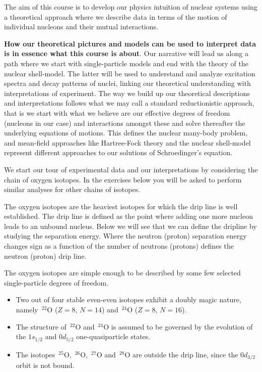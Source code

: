 \documentclass[graybox,sectrefs,envcountresetchap,open=right]{svmonodo}
\begin{document}
The aim of this course is to develop our physics intuition of nuclear systems using  a theoretical approach  where we describe data in terms of 
the motion of individual nucleons and their mutual interactions. 

\textbf{How our theoretical pictures and models can be used to interpret data is in essence what this course is about}. Our narrative will lead us along a path where we start with single-particle models and end with the theory of the nuclear shell-model. The latter will be used to understand and analyze excitation spectra and decay patterns of nuclei, linking our theoretical understanding with interpretations of experiment. The way we build up our theoretical descriptions and interpretations follows what we may call a standard reductionistic approach, that is we start with what we believe are our effective degrees of freedom (nucleons in our case) and interactions amongst these and solve thereafter the underlying equations of motions. This defines the nuclear many-body problem, and mean-field approaches like Hartree-Fock theory and the nuclear shell-model represent different approaches to our solutions of Schroedinger's equation. 



We start our tour of experimental data and our interpretations by considering the chain of oxygen isotopes. In the exercises below you will be asked to perform similar analyses for other chains of isotopes.

The oxygen isotopes are the heaviest isotopes for which the drip line is well established.  The drip line is defined as the point where adding one more nucleon leads to an unbound nucleus. Below we will see that we can define the dripline by studying the separation energy. Where the neutron (proton) separation energy changes sign as a function of the number of neutrons (protons) defines the neutron (proton) drip line.

The oxygen isotopes are simple enough to be described by some few selected single-particle degrees of freedom.  

\begin{itemize}
\item Two out of four stable even-even isotopes exhibit a doubly magic nature, namely $\,{}^{22}\mbox{O}$ ($Z=8$, $N=14$) and $\,{}^{24}\mbox{O}$ ($Z=8$, $N=16$).

\item The structure of $\,{}^{22}\mbox{O}$ and $\,{}^{24}\mbox{O}$ is assumed to be governed by the evolution of the $1s_{1/2}$ and $0d_{5/2}$  one-quasiparticle states.

\item The isotopes $\,{}^{25}\mbox{O}$, $\,{}^{26}\mbox{O}$, $\,{}^{27}\mbox{O}$ and $\,{}^{28}\mbox{O}$ are outside the drip line, since the $0d_{3/2}$ orbit is not bound.
\end{itemize}
\end{document}
